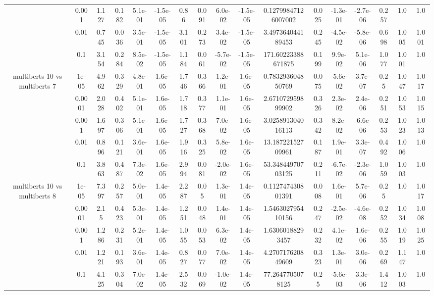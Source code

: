 \begin{tabular}{|c|c|c|c|c|c|c|c|c|c|c|c|c|c|c|c|c|}
 & 0.001 & 1.127 & 0.182 & 5.1e-01 & -1.5e-05 & 0.86 & 0.091 & 6.0e-02 & -1.5e-05 & 0.12799847126007002 & 0.025 & -1.3e-01 & -2.7e-06 & 0.257 & 1.0 & 1.0 \\
 & 0.01 & 0.745 & 0.036 & 3.5e-01 & -1.5e-05 & 3.101 & 0.273 & 3.4e-02 & -1.5e-05 & 3.497364044189453 & 0.245 & -4.5e-02 & -5.8e-06 & 0.698 & 1.005 & 1.001 \\
 & 0.1 & 3.154 & 0.284 & 8.5e-02 & -1.5e-05 & 1.184 & 0.061 & -5.7e-02 & -1.5e-05 & 171.60223388671875 & 0.199 & 9.9e-02 & 5.1e-06 & 1.077 & 1.001 & 1.0 \\
\hline
\multirow{5}{*}{multiberts 10 vs multiberts 7} & 1e-05 & 4.962 & 0.329 & 4.8e-01 & 1.6e-05 & 1.746 & 0.366 & 1.2e-01 & 1.6e-05 & 0.783293604850769 & 0.075 & -5.6e-02 & 3.7e-07 & 0.25 & 1.047 & 1.017 \\
 & 0.0001 & 2.028 & 0.402 & 5.1e-01 & 1.6e-05 & 1.718 & 0.377 & 1.1e-01 & 1.6e-05 & 2.671072959899902 & 0.326 & 2.3e-02 & 2.4e-06 & 0.251 & 1.053 & 1.015 \\
 & 0.001 & 1.697 & 0.306 & 5.1e-01 & 1.6e-05 & 1.727 & 0.368 & 7.0e-02 & 1.6e-05 & 3.025891304016113 & 0.342 & 8.2e-02 & -6.6e-06 & 0.253 & 1.023 & 1.013 \\
 & 0.01 & 0.896 & 0.121 & 3.6e-01 & 1.6e-05 & 1.916 & 0.325 & 5.8e-02 & 1.6e-05 & 13.18722152709961 & 0.187 & 1.9e-01 & 3.3e-07 & 0.492 & 1.006 & 1.0 \\
 & 0.1 & 3.863 & 0.487 & 7.3e-02 & 1.6e-05 & 2.994 & 0.081 & -2.0e-02 & 1.6e-05 & 53.34844970703125 & 0.211 & -6.7e-02 & -2.3e-06 & 1.059 & 1.003 & 1.0 \\
\hline
\multirow{5}{*}{multiberts 10 vs multiberts 8} & 1e-05 & 7.397 & 0.257 & 5.0e-01 & 1.4e-05 & 2.287 & 0.05 & 1.3e-01 & 1.4e-05 & 0.112747430801391 & 0.008 & 1.6e-01 & 5.7e-06 & 0.25 & 1.0 & 1.017 \\
 & 0.0001 & 2.15 & 0.423 & 5.3e-01 & 1.4e-05 & 1.251 & 0.048 & 1.4e-01 & 1.4e-05 & 1.546302795410156 & 0.247 & -2.5e-02 & -4.6e-08 & 0.252 & 1.034 & 1.008 \\
 & 0.001 & 1.286 & 0.231 & 5.2e-01 & 1.4e-05 & 1.055 & 0.053 & 6.3e-02 & 1.4e-05 & 1.63060188293457 & 0.232 & 4.1e-02 & 1.6e-06 & 0.255 & 1.019 & 1.025 \\
 & 0.01 & 1.221 & 0.193 & 3.6e-01 & 1.4e-05 & 0.827 & 0.077 & 7.0e-02 & 1.4e-05 & 4.270717620849609 & 0.323 & 1.3e-01 & 3.0e-06 & 0.269 & 1.147 & 1.0 \\
 & 0.1 & 4.125 & 0.304 & 7.0e-02 & 1.4e-05 & 2.532 & 0.069 & -1.0e-02 & 1.4e-05 & 77.2647705078125 & 0.25 & -5.6e-03 & 3.3e-06 & 1.412 & 1.003 & 1.0 \\

\end{tabular}
